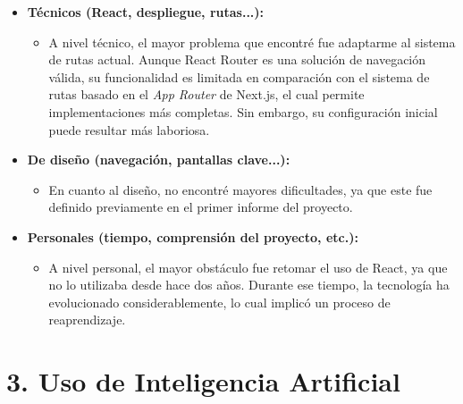 \documentclass[12pt]{article}
\begin{document}
\begin{itemize}
  \item \textbf{Técnicos (React, despliegue, rutas...):}
  \begin{itemize}
    \item A nivel técnico, el mayor problema que encontré fue adaptarme al sistema de rutas actual. Aunque React Router es una solución de navegación válida, su funcionalidad es limitada en comparación con el sistema de rutas basado en el \textit{App Router} de Next.js, el cual permite implementaciones más completas. Sin embargo, su configuración inicial puede resultar más laboriosa.
  \end{itemize}
  
  \item \textbf{De diseño (navegación, pantallas clave...):}
  \begin{itemize}
    \item En cuanto al diseño, no encontré mayores dificultades, ya que este fue definido previamente en el primer informe del proyecto.
  \end{itemize}
  
  \item \textbf{Personales (tiempo, comprensión del proyecto, etc.):}
  \begin{itemize}
    \item A nivel personal, el mayor obstáculo fue retomar el uso de React, ya que no lo utilizaba desde hace dos años. Durante ese tiempo, la tecnología ha evolucionado considerablemente, lo cual implicó un proceso de reaprendizaje.
  \end{itemize}
\end{itemize}


\section*{3. Uso de Inteligencia Artificial}
\end{document}
